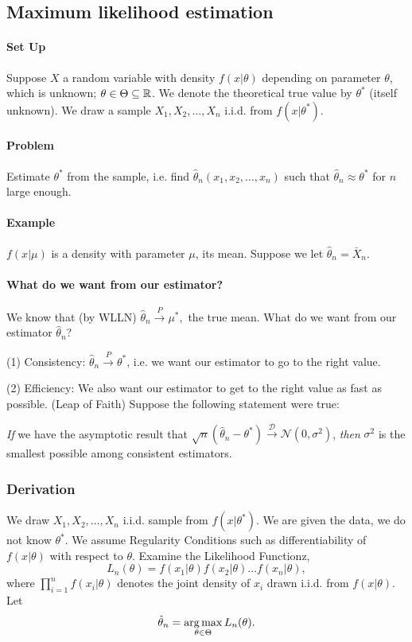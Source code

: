 \documentclass[12pt]{article}\usepackage[]{graphicx}\usepackage[]{color}
\begin{document}
\subsection{Maximum likelihood estimation}

\paragraph{Set Up} Suppose $X$ a random variable with density $f(x|\theta)$ 
depending on parameter $\theta$, which is unknown; $\theta \in \Theta \subseteq \Bbb R$. We denote the theoretical true value by $\theta^*$ (itself
unknown). We draw a sample $X_1, X_2, \ldots, X_n$ i.i.d. from
$f(x|\theta^*)$.

\paragraph{Problem} Estimate $\theta^*$ from the sample, i.e.
find $\hat \theta_n(x_1, x_2, \ldots, x_n)$ such that $\hat \theta_n \approx \theta^*$ for $n$ large enough.

\paragraph{Example} $f(x|\mu)$ is a density with parameter $\mu$, its mean.
Suppose we let $\hat \theta_n = \bar X_n$. 

\paragraph{What do we want from our estimator?}
We know that (by WLLN) 
$\hat \theta_n \overset{P}{\longrightarrow} \mu^*,$ the true mean. What do we want
from our estimator $\hat \theta_n$?

(1) Consistency: $\hat \theta_n \overset{P}{\longrightarrow} \theta^*$, i.e.
we want our estimator to go to the right value.

(2) Efficiency: We also want our estimator to get to the right value as fast as possible.
(Leap of Faith) Suppose the following statement were true:

\emph{If} we have the asymptotic result that
  $\sqrt n (\hat \theta_n - \theta^*) \overset{ \mathcal D}{\longrightarrow} \mathcal N (0, \sigma^2)$,
\emph{then} $\sigma^2$ is the smallest possible among consistent estimators.

\subsubsection{Derivation}
We draw $X_1, X_2, \ldots, X_n$ i.i.d. sample from $f(x|\theta^*)$.
We are given the data, we do not know $\theta^*$.
We assume Regularity Conditions such as differentiability of 
$f(x|\theta)$ with respect to $\theta$.
Examine the Likelihood Functionz,
\[
L_n(\theta) = f(x_1|\theta) f(x_2|\theta) \ldots f(x_n|\theta),
\]
where $\prod_{i=1}^nf(x_i|\theta)$ denotes the joint density of 
$x_i$ drawn i.i.d. from $f(x|\theta)$. Let 
\[
\hat \theta_n = \operatorname*{arg\,max}_{\theta \in \Theta} L_n(\theta).
\]
\end{document}
